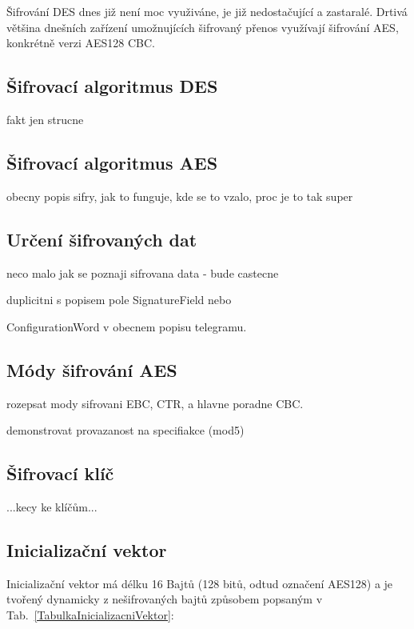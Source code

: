 Šifrování DES dnes již není moc využiváne, je již nedostačující a zastaralé. Drtivá většina dnešních zařízení umožnujících šifrovaný přenos využívají šifrování AES, konkrétně verzi AES128 CBC.

\subsection{Šifrovací algoritmus DES}
\colorbox[rgb]{1,0,0}{fakt jen strucne}

\subsection{Šifrovací algoritmus AES}
\colorbox[rgb]{1,0,0}{obecny popis sifry, jak to funguje, kde se to vzalo, proc je to tak super}


\subsection{Určení šifrovaných dat}
\colorbox[rgb]{1,0,0}{neco malo jak se poznaji sifrovana data - bude castecne }

\colorbox[rgb]{1,0,0}{duplicitni s popisem pole SignatureField nebo }

\colorbox[rgb]{1,0,0}{ConfigurationWord v obecnem popisu telegramu.}


\subsection{Módy šifrování AES}
\colorbox[rgb]{1,0,0}{rozepsat mody sifrovani EBC, CTR, a hlavne poradne CBC.}

\colorbox[rgb]{1,0,0}{demonstrovat provazanost na specifiakce (mod5)}

\subsection{Šifrovací klíč}
\colorbox[rgb]{1,0,0}{...kecy ke klíčům...}

\subsection{Inicializační vektor}
Inicializační vektor má délku 16 Bajtů (128 bitů, odtud označení AES128) a je tvořený dynamicky z nešifrovaných bajtů způsobem popsaným v Tab.~\ref{TabulkaInicializacniVektor}:

